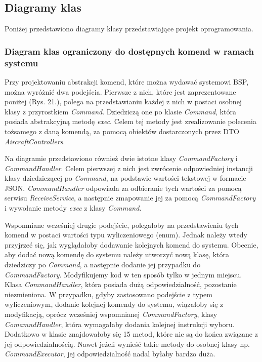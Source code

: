 \subsection{Diagramy klas}
Poniżej przedstawiono diagramy klasy przedstawiające projekt oprogramowania.

\subsubsection{Diagram klas ograniczony do dostępnych komend w ramach systemu}

Przy projektowaniu abstrakcji komend, które można wydawać systemowi BSP, można wyróżnić dwa podejścia. Pierwsze z nich, które jest zaprezentowane poniżej (Rys. 21.), polega na przedstawianiu każdej z nich w postaci osobnej klasy z przyrostkiem \textit{Command}. Dziedziczą one po klasie \textit{Command}, która posiada abstrakcyjną metodę \textit{exec}. Celem tej metody jest zrealizowanie polecenia tożsamego z daną komendą, za pomocą obiektów dostarczonych przez DTO \textit{AircraftControllers}.

Na diagramie przedstawiono również dwie istotne klasy \textit{CommandFactory} i \textit{CommandHandler}. Celem pierwszej z nich jest zwrócenie odpowiedniej instancji klasy dziedziczącej po \textit{Command}, na podstawie wartości tekstowej w formacie JSON. \textit{CommandHandler} odpowiada za odbieranie tych wartości za pomocą serwisu \textit{ReceiveService}, a następnie zmapowanie jej za pomocą \textit{CommandFactory} i wywołanie metody \textit{exec} z klasy \textit{Command}.

Wspomniane wcześniej drugie podejście, polegałoby na przedstawieniu tych komend w postaci wartości typu wyliczeniowego (enum). Jednak należy wtedy przyjrzeć się, jak wyglądałoby dodawanie kolejnych komend do systemu. Obecnie, aby dodać nową komendę do systemu należy utworzyć nową klasę, która dziedziczy po \textit{Command}, a następnie dodanie jej przypadku do \textit{CommandFactory}. Modyfikujemy kod w ten sposób tylko w jednym miejscu. Klasa \textit{CommandHandler}, która posiada dużą odpowiedzialność, pozostanie niezmieniona. W przypadku, gdyby zastosowano podejście z typem wyliczeniowym, dodanie kolejnej komendy do systemu, wiązałoby się z modyfikacją, oprócz wcześniej wspomnianej \textit{CommandFactory}, klasy \textit{ComamndHandler}, która wymagałaby dodania kolejnej instrukcji wyboru. Dodatkowo w klasie znajdowałoby się 15 metod, które nie są do końca związane z jej odpowiedzialnością. Nawet jeżeli wynieść takie metody do osobnej klasy np. \textit{CommandExecutor}, jej odpowiedzialność nadal byłaby bardzo duża.

